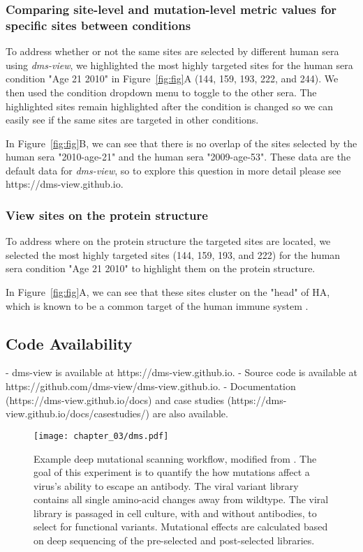 \subsubsection{Comparing site-level and mutation-level metric values for specific sites between conditions}

To address whether or not the same sites are selected by different human sera using \emph{dms-view}, we highlighted the most highly targeted sites for the human sera condition "Age 21 2010" in Figure~\ref{fig:fig}A (144, 159, 193, 222, and 244).
We then used the condition dropdown menu to toggle to the other sera.
The highlighted sites remain highlighted after the condition is changed so we can easily see if the same sites are targeted in other conditions.

In Figure~\ref{fig:fig}B, we can see that there is no overlap of the sites selected by the human sera "2010-age-21" and the human sera "2009-age-53".
These data are the default data for \emph{dms-view}, so to explore this question in more detail please see https://dms-view.github.io.

\subsubsection{View sites on the protein structure}

To address where on the protein structure the targeted sites are located, we selected the most highly targeted sites (144, 159, 193, and 222) for the human sera condition "Age 21 2010" to highlight them on the protein structure.

In Figure~\ref{fig:fig}A, we can see that these sites cluster on the "head" of HA, which is known to be a common target of the human immune system \citep{Chambers:2015jt}.

\subsection{Code Availability}

- dms-view is available at https://dms-view.github.io.
- Source code is available at https://github.com/dms-view/dms-view.github.io.
- Documentation (https://dms-view.github.io/docs) and case studies (https://dms-view.github.io/docs/casestudies/) are also available.

\begin{figure}[ht]
  \centering
  \texttt{[image: chapter\_03/dms.pdf]}
  \caption{Example deep mutational scanning workflow, modified from \citet{Lee2019}. The goal of this experiment is to quantify the how mutations affect a virus's ability to escape an antibody. The viral variant library contains all single amino-acid changes away from wildtype. The viral library is passaged in cell culture, with and without antibodies, to select for functional variants. Mutational effects are calculated based on deep sequencing of the pre-selected and post-selected libraries.\label{fig:dms}}
\end{figure}

